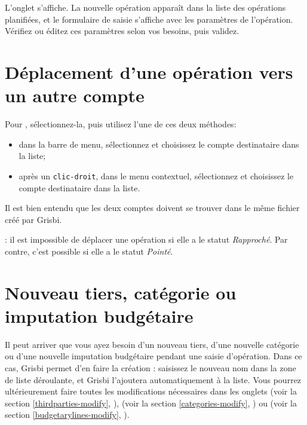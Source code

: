 L'onglet  s'affiche. La nouvelle opération apparaît dans la liste des opérations planifiées, et le formulaire de saisie s'affiche avec les paramètres de l'opération. Vérifiez ou éditez ces paramètres selon vos besoins, puis validez.


\section{Déplacement d'une opération vers un autre compte\label{transactions-move}}

Pour , sélectionnez-la, puis utilisez l'une de ces deux méthodes:
\begin{itemize}
	\item dans la barre de menu, sélectionnez  et choisissez le compte destinataire dans la liste;
	\item après un \texttt{clic-droit}, dans le menu contextuel, sélectionnez  et choisissez le compte destinataire dans la liste.
\end{itemize}

Il est bien entendu que les deux comptes doivent se trouver dans le même fichier créé par Grisbi.

\Note{}: il est impossible de déplacer une opération si elle a le statut \emph{Rapproché}. Par contre, c'est possible si elle a le statut \emph{Pointé}.


\section{Nouveau tiers, catégorie ou imputation budgétaire\label{transactions-fillcombo}}

Il peut arriver que vous ayez besoin d'un nouveau tiers, d'une nouvelle catégorie ou d'une nouvelle imputation budgétaire pendant une saisie d'opération. Dans ce cas, Grisbi permet d'en faire la création : saisissez le nouveau nom dans la zone de liste déroulante, et Grisbi l'ajoutera automatiquement à la liste. Vous pourrez ultérieurement faire toutes les modifications nécessaires dans les onglets  (voir la section \vref{thirdparties-modify}, ),  (voir la section \vref{categories-modify}, ) ou  (voir la section \vref{budgetarylines-modify}, ).
 
